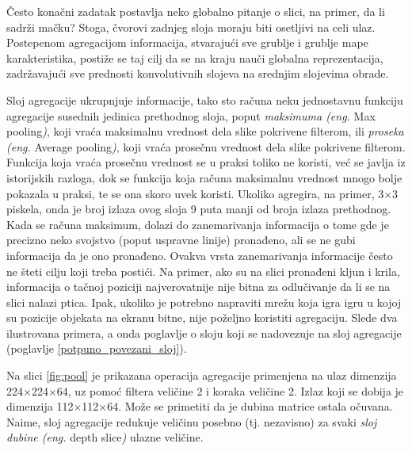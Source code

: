 \documentclass[a4paper]{article}
\begin{document}
Često konačni zadatak postavlja neko globalno pitanje o slici, na primer, da li sadrži mačku? Stoga, čvorovi zadnjeg sloja moraju biti osetljivi na celi ulaz. Postepenom agregacijom informacija, stvarajući sve grublje i grublje mape karakteristika, postiže se taj cilj da se na kraju nauči globalna reprezentacija, zadržavajući sve prednosti konvolutivnih slojeva na srednjim slojevima obrade.

Sloj agregacije ukrupnjuje informacije, tako sto računa neku jednostavnu funkciju agregacije susednih jedinica prethodnog sloja, poput \textit{maksimuma (eng.} Max pooling\textit{)}, koji vraća maksimalnu vrednost dela slike pokrivene filterom, ili \textit{proseka (eng.} Average pooling\textit{)}, koji vraća prosečnu vrednost dela slike pokrivene filterom. Funkcija koja vraća prosečnu vrednost se u praksi toliko ne koristi, već se javlja iz istorijskih razloga, dok se funkcija koja računa maksimalnu vrednost mnogo bolje pokazala u praksi, te se ona skoro uvek koristi. Ukoliko agregira, na primer, 3$\times$3 piskela, onda je broj izlaza ovog sloja 9 puta manji od broja izlaza prethodnog. Kada se računa maksimum, dolazi do zanemarivanja informacija o tome gde je precizno neko svojstvo (poput uspravne linije) pronađeno, ali se ne gubi informacija da je ono pronađeno. Ovakva vrsta zanemarivanja informacije često ne šteti cilju koji treba postići. Na primer, ako su na slici pronađeni kljun i krila, informacija o tačnoj poziciji najverovatnije nije bitna za odlučivanje da li se na slici nalazi ptica. Ipak, ukoliko je potrebno napraviti mrežu koja igra igru u kojoj su pozicije objekata na ekranu bitne, nije poželjno koristiti agregaciju. Slede dva ilustrovana primera, a onda poglavlje o sloju koji se nadovezuje na sloj agregacije (poglavlje \ref{potpuno_povezani_sloj}).

Na slici \ref{fig:pool} je prikazana operacija agregacije primenjena na ulaz dimenzija 224$\times$224$\times$64, uz pomoć filtera veličine 2 i koraka veličine 2. Izlaz koji se dobija je dimenzija 112$\times$112$\times$64. Može se primetiti da je dubina matrice ostala očuvana. Naime, sloj agregacije redukuje veličinu posebno (tj. nezavisno) za svaki \textit{sloj dubine (eng.} depth slice\textit{)} ulazne veličine.
\end{document}

